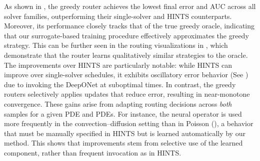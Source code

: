\documentclass{article}
\begin{document}
As shown in , the greedy router achieves the lowest final error and AUC across all solver families, outperforming their single-solver and HINTS counterparts.  Moreover, its performance closely tracks that of the true greedy oracle, indicating that our surrogate-based training procedure effectively approximates the greedy strategy. This can be further seen in the routing visualizations in , which demonstrate that the router learns qualitatively similar strategies to the oracle. The improvements over HINTS are particularly notable: while HINTS can improve over single-solver schedules, it exhibits oscillatory error behavior (See ) due to invoking the DeepONet at suboptimal times. In contrast, the greedy routers selectively applies updates that reduce error, resulting in near-monotone convergence. These gains arise from adapting routing decisions across \textit{both} samples for a given PDE and PDEs. For instance, the neural operator is used more frequently in the convection–diffusion setting than in Poisson (), a behavior that must be manually specified in HINTS but is learned automatically by our method. 
This shows that improvements stem from selective use of the learned component, rather than frequent invocation as in HINTS.
\end{document}
